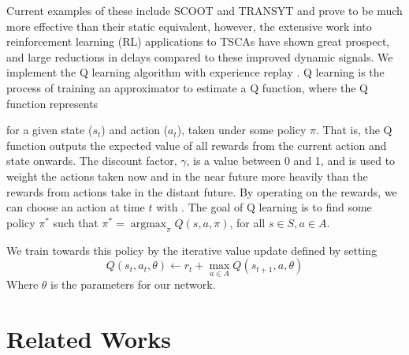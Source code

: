 \documentclass[12pt,twocolumn]{article}
\DeclareMathOperator*{\argmax}{arg\max}
\begin{document}
Current examples of these include SCOOT and TRANSYT \cite{Robertson1991} and prove to be much more effective than their static equivalent, however, the extensive work into reinforcement learning (RL) applications to TSCAs have shown great prospect, and large reductions in delays compared to these improved dynamic signals.
% 
We implement the Q learning algorithm with experience replay \cite{Watkins1989, DeepmindAtari, DeepmindLocomotion}. Q learning is the process of training an approximator to estimate a Q function, where the Q function represents

for a given state (\(s_t\)) and action (\(a_t\)), taken under some policy \(\pi\). That is, the Q function outputs the expected value of all rewards from the current action and state onwards. The discount factor, \(\gamma\), is a value between 0 and 1, and is used to weight the actions taken now and in the near future more heavily than the rewards from actions take in the distant future. By operating on the rewards, we can choose an action at time \(t\) with
.
The goal of Q learning is to find some policy \(\pi^*\) such that \(\pi^* = \argmax_{\pi}Q(s,a,\pi)\), for all \(s\in S, a\in A\).

We train towards this policy by the iterative value update defined by setting 
\[
    Q(s_t,a_t,\theta) \leftarrow r_t+\max_{a\in A}Q(s_{t+1},a,\theta)
\]
Where \(\theta\) is the parameters for our network.

\section{Related Works}
\end{document}
